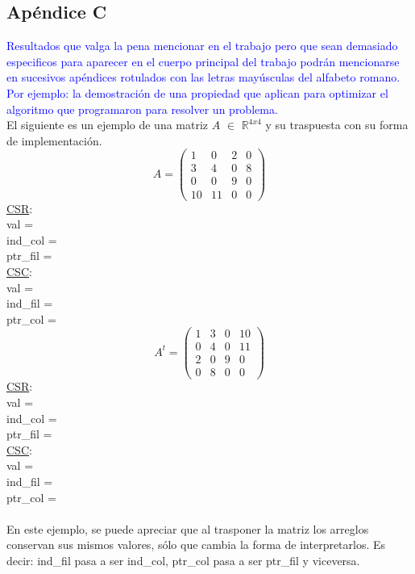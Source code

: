\documentclass[a4paper]{article}
\begin{document}
	\subsection{Ap\'endice C}
\textcolor{blue}{Resultados que valga la pena mencionar en el trabajo pero que sean demasiado especificos para
aparecer en el cuerpo principal del trabajo podr\'an mencionarse en sucesivos ap\'endices
rotulados con las letras may\'usculas del alfabeto romano. Por ejemplo: la demostraci\'on
de una propiedad que aplican para optimizar el algoritmo que programaron para resolver
un problema.}\\
El siguiente es un ejemplo de una matriz $A$ $\in$ $\mathbb{R}^{4x4}$ y su traspuesta con su forma de implementaci\'on.\\
\begin{equation}
A = \left(
\begin{array}{cccc}
1 & 0 & 2 & 0 \\
3 & 4 & 0 & 8 \\
0 & 0 & 9 & 0 \\
10 & 11 & 0 & 0
\end{array}
\right)
\end{equation}
 \underline{CSR}:\\
 \indent \indent val = \indent \indent  [1,2,3,4,8,9,10,11]\\
 \indent \indent ind_col = \indent [0,2,0,1,3,2,0,1]\\
 \indent \indent ptr_fil = \indent [0,2,5,6,8]\\
 \underline{CSC}:\\
 \indent \indent val = \indent \indent [1,3,10,4,11,2,9,8]\\
 \indent \indent ind_fil = \indent [0,1,3,1,3,0,2,1]\\
 \indent \indent ptr_col = \indent [0,3,5,7,8]\\
\begin{equation}
A^t = \left(
\begin{array}{cccc}
1 & 3 & 0 & 10 \\
0 & 4 & 0 & 11 \\
2 & 0 & 9 & 0 \\
0 & 8 & 0 & 0
\end{array}
\right)
\end{equation}
 \underline{CSR}:\\
 \indent \indent val = \indent \indent [1,3,10,4,11,2,9,8]\\
 \indent \indent ind_col = \indent [0,1,3,1,3,0,2,1]\\
 \indent \indent ptr_fil = \indent [0,3,5,7,8]\\
 \underline{CSC}:\\
 \indent \indent val = \indent \indent  [1,2,3,4,8,9,10,11]\\
 \indent \indent ind_fil = \indent [0,2,0,1,3,2,0,1]\\
 \indent \indent ptr_col = \indent [0,2,5,6,8]\\
 \\
 En este ejemplo, se puede apreciar que al trasponer la matriz los arreglos conservan sus mismos valores, s\'olo que cambia la forma de interpretarlos. Es decir: ind_fil pasa a ser ind_col, ptr_col pasa a ser ptr_fil y viceversa.
\newpage
\end{document}

